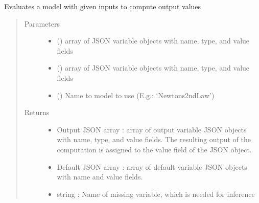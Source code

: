 \documentclass[letterpaper,10pt,english]{sphinxmanual}
\begin{document}
\begin{fulllineitems}
\begin{fulllineitems}
\begin{quote}
\begin{description}
\begin{itemize}
\end{itemize}

\end{description}\end{quote}

\end{fulllineitems}


\begin{fulllineitems}
\label{\detokenize{index:kChain.kChainModel.evaluate}}
Evaluates a model with given inputs to compute output values
\begin{quote}\begin{description}
\item[{Parameters}] \leavevmode\begin{itemize}
\item {} 
 () \textendash{} array of JSON variable objects with name, type, and value fields

\item {} 
 () \textendash{} array of JSON variable objects with name, type, and value fields

\item {} 
 () \textendash{} Name to model to use (E.g.: ‘Newtons2ndLaw’)

\end{itemize}

\item[{Returns}] \leavevmode
\begin{itemize}
\item {} 
Output JSON array : array of output variable JSON objects with name, type, and value fields. The resulting output of the computation is assigned to the value field of the JSON object.

\item {} 
Default JSON array : array of default variable JSON objects with name and value fields.

\item {} 
string : Name of missing variable, which is needed for inference


\end{itemize}
\end{description}
\end{quote}
\end{fulllineitems}
\end{fulllineitems}
\end{document}
